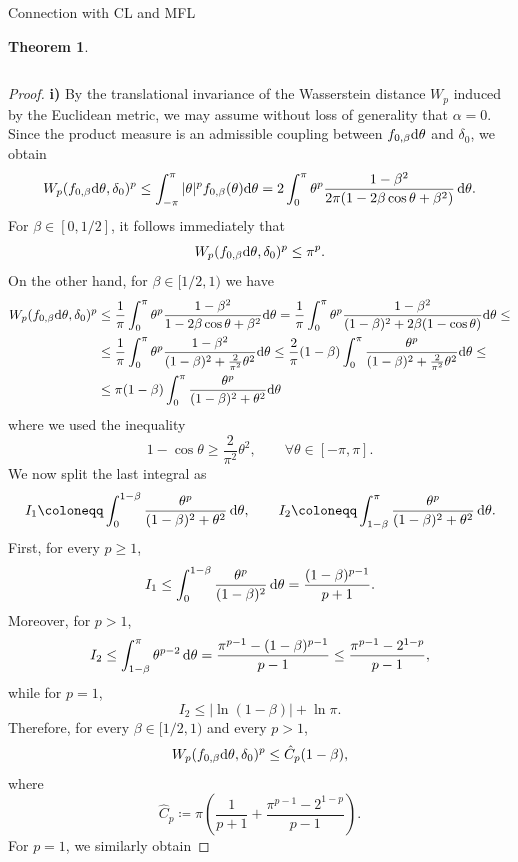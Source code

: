 \documentclass{article}
\theoremstyle{definition}
\newtheorem{theorem}[definition]{Theorem}
\renewcommand{\d}{\textnormal{d}}
\begin{document}
\begin{section}{Connection with CL and MFL}
\begin{theorem}
\begin{enumerate}
\begin{equation}
\end{equation}
\end{enumerate}
\end{theorem}
    \begin{proof} \textbf{i)} By the translational invariance of the Wasserstein distance $W_p$ induced by the Euclidean metric, we may assume without loss of generality that $\alpha=0$. Since the product measure is an admissible coupling between $f_{0,\beta}\d\theta$ and $\delta_0$, we obtain 
    $$W_p(f_{0,\beta}\d\theta,\delta_0)^p\leq\int_{-\pi}^\pi|\theta|^pf_{0,\beta}(\theta)\d\theta =2\int_0^\pi\theta^p\frac{1-\beta^2}{2\pi(1-2\beta\cos\theta+\beta^2)}\,\d\theta.$$
    For $\beta\in[0,1/2]$, it follows immediately that
    \begin{equation}\label{low_beta} W_p(f_{0,\beta}\d\theta,\delta_0)^p\leq\pi^p.
    \end{equation}
    On the other hand, for $\beta\in[1/2,1)$ we have
    \begin{align*}
            W_p(f_{0,\beta}\d\theta,\delta_0)^p&\leq\frac{1}{\pi}\int_0^\pi\theta^p\frac{1-\beta^2}{1-2\beta\cos\theta+\beta^2}\d\theta=\frac{1}{\pi}\int_0^\pi\theta^p\frac{1-\beta^2}{(1-\beta)^2+2\beta(1-\cos\theta)}\d\theta\leq\\
            &\leq\frac{1}{\pi}\int_0^\pi\theta^p\frac{1-\beta^2}{(1-\beta)^2+\frac{2}{\pi^2}\theta^2}\d\theta\leq\frac{2}{\pi}(1-\beta)\int_0^\pi\frac{\theta^p}{(1-\beta)^2+\frac{2}{\pi^2}\theta^2}\d\theta\leq\\
            &\leq\pi(1-\beta)\int_0^\pi\frac{\theta^p}{(1-\beta)^2+\theta^2}\d\theta
    \end{align*}
    where we used the inequality $$1-\cos\theta\geq\frac{2}{\pi^2}\theta^2,\qquad \forall\theta\in[-\pi,\pi].$$ We now split the last integral as 
    $$I_1\coloneqq\int_0^{1-\beta}\frac{\theta^p}{(1-\beta)^2+\theta^2}\,\d\theta, \qquad I_2\coloneqq\int_{1-\beta}^{\pi}\frac{\theta^p}{(1-\beta)^2+\theta^2}\,\d\theta.$$
    First, for every $p\geq1$,
    $$I_1\leq\int_0^{1-\beta}\frac{\theta^p}{(1-\beta)^2}\,\d\theta =\frac{(1-\beta)^{p-1}}{p+1}.$$
    Moreover, for $p>1$,
    $$I_2\leq\int_{1-\beta}^{\pi}\theta^{p-2}\,\d\theta =\frac{\pi^{p-1}-(1-\beta)^{p-1}}{p-1} \leq\frac{\pi^{p-1}-2^{1-p}}{p-1},$$
    while for $p=1$,
    $$I_2\leq|\ln(1-\beta)|+\ln\pi.$$
    Therefore, for every $\beta\in[1/2,1)$ and every $p>1$,
    $$W_p(f_{0,\beta}\d\theta,\delta_0)^p \leq\hat{C}_p(1-\beta),$$
    where
    $$\hat{C}_p\coloneqq \pi\left(\frac{1}{p+1} + \frac{\pi^{p-1}-2^{1-p}}{p-1}\right).$$
    For $p=1$, we similarly obtain

\end{proof}
\end{section}
\end{document}
